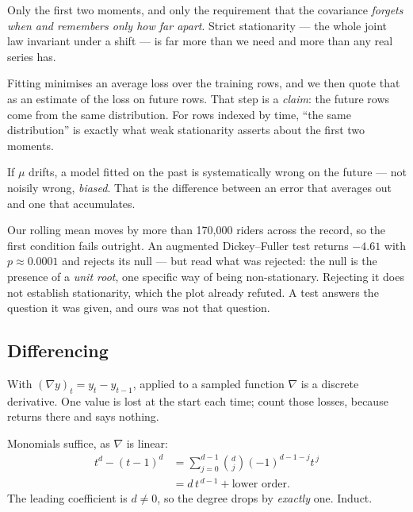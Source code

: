 \documentclass[11pt,a4paper]{article}
\begin{document}
Only the first two moments, and only the requirement that the covariance
\emph{forgets when and remembers only how far apart}. Strict stationarity ---
the whole joint law invariant under a shift --- is far more than we need and
more than any real series has.

\begin{keybox}[title={Why a model depends on it}]
Fitting minimises an average loss over the training rows, and we then quote
that as an estimate of the loss on future rows. That step is a \emph{claim}:
the future rows come from the same distribution. For rows indexed by time,
``the same distribution'' is exactly what weak stationarity asserts about the
first two moments.

If $\mu$ drifts, a model fitted on the past is systematically wrong on the
future --- not noisily wrong, \emph{biased}. That is the difference between an
error that averages out and one that accumulates.
\end{keybox}

Our rolling mean moves by more than 170{,}000 riders across the record, so the
first condition fails outright. An augmented Dickey--Fuller test returns
$-4.61$ with $p \approx 0.0001$ and rejects its null --- but read what was
rejected: the null is the presence of a \emph{unit root}, one specific way of
being non-stationary. Rejecting it does not establish stationarity, which the
plot already refuted. A test answers the question it was given, and ours was
not that question.

\subsection{Differencing}

With $(\nabla y)_t = y_t - y_{t-1}$, applied to a sampled function $\nabla$ is
a discrete derivative. One value is lost at the start each time; count those
losses, because  returns  there and says nothing.

\begin{derivbox}[title={$\nabla^{d}$ annihilates a polynomial trend of degree $d$}]
Monomials suffice, as $\nabla$ is linear:
\[
\begin{aligned}
t^{d} - (t-1)^{d}
 &= \sum_{j=0}^{d-1}\binom{d}{j}(-1)^{d-1-j}t^{\,j} \\
 &= d\,t^{\,d-1} + \text{lower order}.
\end{aligned}
\]
The leading coefficient is $d \neq 0$, so the degree drops by \emph{exactly}
one. Induct.
\end{derivbox}
\end{document}
